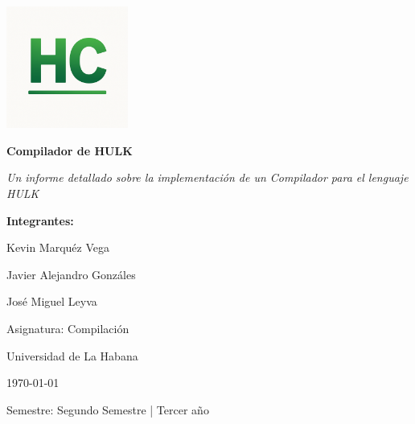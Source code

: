 \documentclass[11pt, a4paper, twoside]{article} %
\begin{document}
\thispagestyle{empty} %

\begin{titlepage}
    \begin{center}
        \vspace*{2cm}

        \includegraphics[width=0.3\textwidth]{logo.png} %
        \vspace{1cm}

        {\color{green!80!black}\Huge\bfseries Compilador de HULK}\par
        \vspace{0.5cm}

        {\color{gray}\Large\itshape Un informe detallado sobre la implementaci\'on de un Compilador para el lenguaje HULK}\par
        \vspace{2cm}

        {\Large\bfseries Integrantes:}\par
        \vspace{0.3cm} %
        {\large  Kevin Marqu\'ez Vega}\par
        {\large  Javier Alejandro Gonz\'ales}\par
        {\large  Jos\'e Miguel Leyva}\par
        \vspace{1.5cm} %

        {\large Asignatura: Compilaci\'on}\par
        {\large Universidad de La Habana}\par
        \vspace{0.5cm}

        {\large \today}\par %
        \vfill %

        {\small \color{gray!70!black} Semestre: Segundo Semestre | Tercer a\~no}\par

    \end{center}
\end{titlepage}
\end{document}
